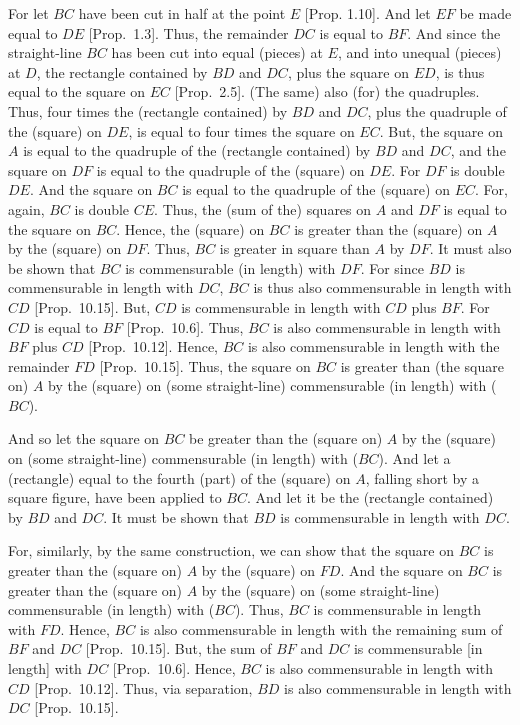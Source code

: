 \epsfysize=1.1in
\centerline{}

For let $BC$ have been cut in  half at the point $E$ [Prop. 1.10]. And let $EF$ be made equal to
$DE$ [Prop.~1.3]. Thus, the remainder $DC$
is equal to $BF$. And since the straight-line $BC$ has been cut into equal
(pieces) at $E$, and into unequal (pieces) at $D$, the rectangle contained by
$BD$ and $DC$, plus the square on $ED$, is thus equal to the square on $EC$ [Prop.~2.5]. (The same) also (for) the quadruples.  
Thus, four times the (rectangle contained) by $BD$ and $DC$, plus
the quadruple of the (square) on $DE$, is equal to four times the square on 
$EC$. But, the square on $A$ is equal to the quadruple of the (rectangle
contained) by $BD$ and $DC$, and the square on $DF$ is equal to
the quadruple of the (square) on $DE$. For $DF$ is double $DE$. 
And the square on  $BC$ is equal to the quadruple of the (square) on $EC$.
For, again, $BC$ is double $CE$. Thus, the (sum of the) squares on $A$ and
$DF$ is equal to the square on $BC$. Hence, the (square) on $BC$
is greater than the (square) on $A$ by the (square) on $DF$. Thus,
$BC$ is greater in square than $A$ by $DF$. It must also be shown that $BC$
is commensurable (in length) with $DF$. For since $BD$ is commensurable in length
with $DC$, $BC$ is thus also commensurable in length with $CD$ [Prop.~10.15]. 
But, $CD$ is commensurable in length with $CD$ plus $BF$. For $CD$ is equal
to $BF$ [Prop.~10.6].  Thus, $BC$ is also commensurable in length with $BF$ plus $CD$
[Prop.~10.12]. Hence, $BC$ is also commensurable
in length with the remainder $FD$ [Prop.~10.15]. Thus, the square on $BC$ is
greater than (the square on) $A$ by the (square) on (some straight-line)
commensurable (in length) with ($BC$).

And so let the square on $BC$ be greater than the (square on) $A$ by the
(square) on (some straight-line) commensurable (in length) with ($BC$). And let
a (rectangle) equal to the fourth (part) of the (square) on $A$, falling
short by a square figure, have been applied to $BC$. And let it be
the (rectangle contained) by $BD$ and $DC$. It must be shown that $BD$
is commensurable in length with $DC$.

For, similarly, by the same construction, we can  show that the
square on $BC$ is greater than the (square on) $A$ by the (square) on $FD$.
And the square on $BC$ is greater than the (square on) $A$ by the
(square) on (some straight-line) commensurable (in length) with ($BC$).  Thus, $BC$ is
commensurable in length with $FD$. Hence, $BC$ is also commensurable in length with the remaining sum of $BF$ and $DC$ [Prop.~10.15]. But, the sum of $BF$ and $DC$
is commensurable [in length] with $DC$ [Prop.~10.6]. Hence, $BC$ is also
commensurable in length with $CD$ [Prop.~10.12]. 
Thus, via separation, $BD$ is also commensurable in length with $DC$ [Prop.~10.15].

